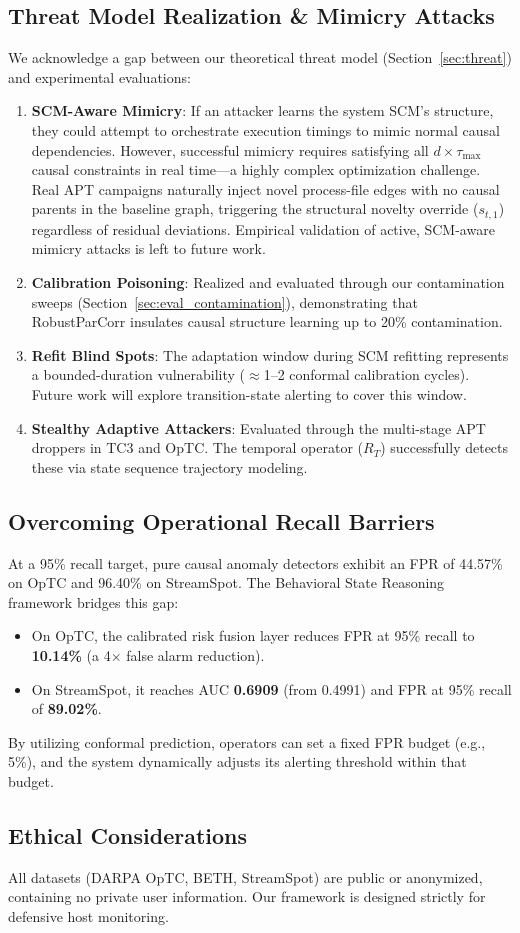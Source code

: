 \subsection{Threat Model Realization \& Mimicry Attacks}
We acknowledge a gap between our theoretical threat model (Section~\ref{sec:threat}) and experimental evaluations:
\begin{enumerate}
\item \textbf{SCM-Aware Mimicry}: If an attacker learns the system SCM's structure, they could attempt to orchestrate execution timings to mimic normal causal dependencies. However, successful mimicry requires satisfying all $d \times \tau_{\max}$ causal constraints in real time---a highly complex optimization challenge. Real APT campaigns naturally inject novel process-file edges with no causal parents in the baseline graph, triggering the structural novelty override ($s_{t,1}$) regardless of residual deviations. Empirical validation of active, SCM-aware mimicry attacks is left to future work.
\item \textbf{Calibration Poisoning}: Realized and evaluated through our contamination sweeps (Section~\ref{sec:eval_contamination}), demonstrating that RobustParCorr insulates causal structure learning up to 20\% contamination.
\item \textbf{Refit Blind Spots}: The adaptation window during SCM refitting represents a bounded-duration vulnerability ($\approx$1--2 conformal calibration cycles). Future work will explore transition-state alerting to cover this window.
\item \textbf{Stealthy Adaptive Attackers}: Evaluated through the multi-stage APT droppers in TC3 and OpTC. The temporal operator ($R_T$) successfully detects these via state sequence trajectory modeling.
\end{enumerate}

\subsection{Overcoming Operational Recall Barriers}
At a 95\% recall target, pure causal anomaly detectors exhibit an FPR of 44.57\% on OpTC and 96.40\% on StreamSpot. The Behavioral State Reasoning framework bridges this gap:
\begin{itemize}
\item On OpTC, the calibrated risk fusion layer reduces FPR at 95\% recall to \textbf{10.14\%} (a 4$\times$ false alarm reduction).
\item On StreamSpot, it reaches AUC \textbf{0.6909} (from 0.4991) and FPR at 95\% recall of \textbf{89.02\%}.
\end{itemize}
By utilizing conformal prediction, operators can set a fixed FPR budget (e.g., 5\%), and the system dynamically adjusts its alerting threshold within that budget.

\subsection{Ethical Considerations}
All datasets (DARPA OpTC, BETH, StreamSpot) are public or anonymized, containing no private user information. Our framework is designed strictly for defensive host monitoring.
